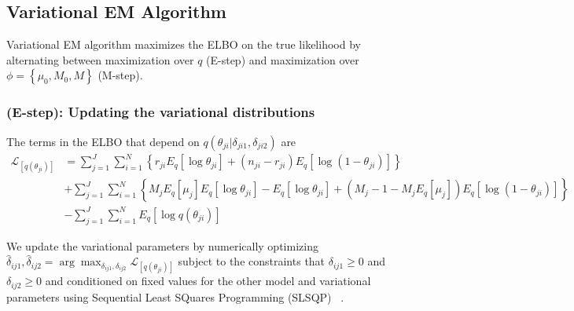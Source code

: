 \documentclass[11pt,reqno]{amsart}
\begin{document}
\subsection{Variational EM Algorithm}
Variational EM algorithm maximizes the ELBO on the true likelihood by alternating between maximization over $q$ (E-step) and maximization over $\phi= \left\{\mu_0, M_0, M \right\}$ (M-step).
\subsubsection{(E-step): Updating the variational distributions}
The terms in the ELBO that depend on $q(\theta_{ji} | \delta_{ji1}, \delta_{ji2})$ are
\begin{equation}\label{eqn:partial_theta}
\begin{split}
\mathcal{L}_{{[q(\theta_{ji})]}}
& = \sum_{j=1}^{J} \sum_{i=1}^{N} \left\lbrace r_{ji} E_q \left[ \log \theta_{ji} \right] + (n_{ji} - r_{ji}) E_q  \left[  \log (1 - \theta_{ji}) \right] \right\rbrace\\
& +  \sum_{j=1}^{J} \sum_{i=1}^{N} \left\lbrace M_j E_q \left[ \mu_j \right] E_q \left[ \log \theta_{ji} \right] - E_q  \left[ \log \theta_{ji} \right] + \left( M_j - 1 - M_j E_q\left[ \mu_j \right]  \right) E_q\left[ \log \left( 1 - \theta_{ji}\right) \right] \right\rbrace\\
& - \sum_{j=1}^{J}\sum_{i=1}^{N} E_q\left[ \log q(\theta_{ji})\right]
\end{split}
\end{equation}

We update the variational parameters by numerically optimizing $\hat{\delta}_{ij1}, \hat{\delta}_{ij2} = \arg \max_{\delta_{ij1}, \delta_{ij2}} \mathcal{L}_{{[q(\theta_{ji})]}}$ subject to the constraints that $\delta_{ij1} \geq 0$ and $\delta_{ij2} \geq 0$ and conditioned on fixed values for the other model and variational parameters using Sequential Least SQuares Programming (SLSQP) ~\citep{kraft1988software}.
\end{document}
